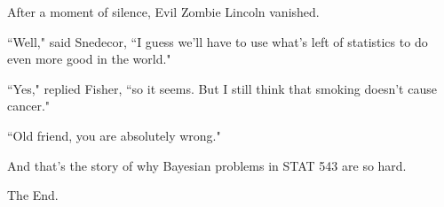 \documentclass{article}
\begin{document}
After a moment of silence, Evil Zombie Lincoln vanished. \newline

``Well," said Snedecor, ``I guess we'll have to use what's left of statistics to do even more good in the world." \newline

``Yes," replied Fisher, ``so it seems. But I still think that smoking doesn't cause cancer." \newline

``Old friend, you are absolutely wrong." \newline

And that's the story of why Bayesian problems in STAT 543 are so hard. \newline

\begin{center}
The End.
\end{center}
\end{document}
